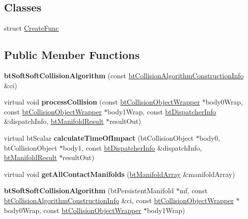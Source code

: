 \subsection*{Classes}
\begin{DoxyCompactItemize}
\item 
struct \hyperlink{structbtSoftSoftCollisionAlgorithm_1_1CreateFunc}{Create\+Func}
\end{DoxyCompactItemize}
\subsection*{Public Member Functions}
\begin{DoxyCompactItemize}
\item 
\mbox{\label{classbtSoftSoftCollisionAlgorithm_a3156701ae0d941d149dd89c0afe12d40}} 
{\bfseries bt\+Soft\+Soft\+Collision\+Algorithm} (const \hyperlink{structbtCollisionAlgorithmConstructionInfo}{bt\+Collision\+Algorithm\+Construction\+Info} \&ci)
\item 
\mbox{\label{classbtSoftSoftCollisionAlgorithm_a17b7d2ccdf40069b0f5236fd92a7bc49}} 
virtual void {\bfseries process\+Collision} (const \hyperlink{structbtCollisionObjectWrapper}{bt\+Collision\+Object\+Wrapper} $\ast$body0\+Wrap, const \hyperlink{structbtCollisionObjectWrapper}{bt\+Collision\+Object\+Wrapper} $\ast$body1\+Wrap, const \hyperlink{structbtDispatcherInfo}{bt\+Dispatcher\+Info} \&dispatch\+Info, \hyperlink{classbtManifoldResult}{bt\+Manifold\+Result} $\ast$result\+Out)
\item 
\mbox{\label{classbtSoftSoftCollisionAlgorithm_a0ed8fb5e792c606652bab06790011346}} 
virtual bt\+Scalar {\bfseries calculate\+Time\+Of\+Impact} (bt\+Collision\+Object $\ast$body0, bt\+Collision\+Object $\ast$body1, const \hyperlink{structbtDispatcherInfo}{bt\+Dispatcher\+Info} \&dispatch\+Info, \hyperlink{classbtManifoldResult}{bt\+Manifold\+Result} $\ast$result\+Out)
\item 
\mbox{\label{classbtSoftSoftCollisionAlgorithm_a8239cc2d97533ca18ea299a69cf7a16c}} 
virtual void {\bfseries get\+All\+Contact\+Manifolds} (\hyperlink{classbtAlignedObjectArray}{bt\+Manifold\+Array} \&manifold\+Array)
\item 
\mbox{\label{classbtSoftSoftCollisionAlgorithm_a30c98dafc3be8e645c48d5d378586a34}} 
{\bfseries bt\+Soft\+Soft\+Collision\+Algorithm} (bt\+Persistent\+Manifold $\ast$mf, const \hyperlink{structbtCollisionAlgorithmConstructionInfo}{bt\+Collision\+Algorithm\+Construction\+Info} \&ci, const \hyperlink{structbtCollisionObjectWrapper}{bt\+Collision\+Object\+Wrapper} $\ast$body0\+Wrap, const \hyperlink{structbtCollisionObjectWrapper}{bt\+Collision\+Object\+Wrapper} $\ast$body1\+Wrap)
\end{DoxyCompactItemize}
